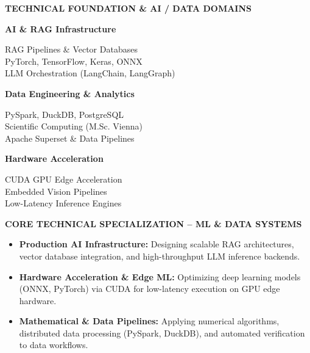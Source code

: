 \documentclass[10pt,a4paper]{article}
\begin{document}
\colorbox{primary!10}{%
\parbox{\dimexpr\textwidth-2\fboxsep\relax}{%
    \vspace{0.10cm}
    \centering
    {\bfseries\color{primary} TECHNICAL FOUNDATION \& AI / DATA DOMAINS\par}
    \vspace{0.08cm}

    \begin{minipage}[t]{0.31\linewidth}
        \raggedright
        \textbf{\color{primary}AI \& RAG Infrastructure}\par
        RAG Pipelines \& Vector Databases\\
        PyTorch, TensorFlow, Keras, ONNX\\
        LLM Orchestration (LangChain, LangGraph)
    \end{minipage}
    \hfill
    \begin{minipage}[t]{0.31\linewidth}
        \raggedright
        \textbf{\color{primary}Data Engineering \& Analytics}\par
        PySpark, DuckDB, PostgreSQL\\
        Scientific Computing (M.Sc. Vienna)\\
        Apache Superset \& Data Pipelines
    \end{minipage}
    \hfill
    \begin{minipage}[t]{0.31\linewidth}
        \raggedright
        \textbf{\color{primary}Hardware Acceleration}\par
        CUDA GPU Edge Acceleration\\
        Embedded Vision Pipelines\\
        Low-Latency Inference Engines
    \end{minipage}

    \vspace{0.08cm}
}%
}

\vspace{0.15cm}

{\centering
\colorbox{accent!25}{%
\parbox{\dimexpr\textwidth-25\fboxsep\relax}{%
    \vspace{0.08cm}
    \centering
    {\bfseries\color{primary}CORE TECHNICAL SPECIALIZATION -- ML \& DATA SYSTEMS\par}
    \vspace{0.05cm}
    \raggedright
    \begin{itemize}[leftmargin=1.5em, itemsep=0.15em, topsep=0.15em]
        \item \textbf{\color{primary}Production AI Infrastructure:} Designing scalable RAG architectures, vector database integration, and high-throughput LLM inference backends.
        \item \textbf{\color{primary}Hardware Acceleration \& Edge ML:} Optimizing deep learning models (ONNX, PyTorch) via CUDA for low-latency execution on GPU edge hardware.
        \item \textbf{\color{primary}Mathematical \& Data Pipelines:} Applying numerical algorithms, distributed data processing (PySpark, DuckDB), and automated verification to data workflows.
    \end{itemize}
    \vspace{0.05cm}
}%
}\par}
\end{document}

